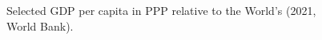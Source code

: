 \documentclass[12pt,english]{article}
\begin{document}



\begin{figure}[h!]
  \caption{Selected GDP per capita in PPP relative to the World's (2021, World Bank).}\label{fig:GDPpc}
\end{figure}
\end{document}
